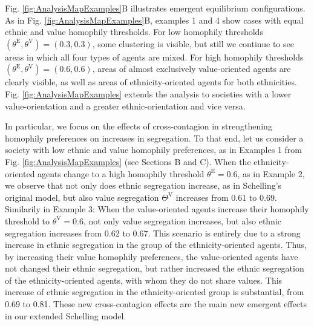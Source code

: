 \documentclass{ws-acs}
\begin{document}
{Fig. \ref{fig:AnalysisMapExamples}B illustrates emergent equilibrium configurations. As in Fig. \ref{fig:AnalysisMapExamples}B, examples 1 and 4 show cases with equal ethnic and value homophily thresholds. For low homophily thresholds $(\theta^\text{E}, \theta^\text{V}) = (0.3,0.3)$, some clustering is visible, but still we continue to see areas in which all four types of agents are mixed. For high homophily thresholds $(\theta^\text{E}, \theta^\text{V}) = (0.6,0.6)$, areas of almost exclusively value-oriented agents are clearly visible, as well as areas of ethnicity-oriented agents for both ethnicities. Fig. \ref{fig:AnalysisMapExamples} extends the analysis to societies with a lower value-orientation and a greater ethnic-orientation and vice versa. 

In particular, we focus on the effects of cross-contagion in strengthening homophily preferences on increases in segregation. To that end, let us consider a society with low ethnic and value homophily preferences, as in Examples 1 from Fig. \ref{fig:AnalysisMapExamples} (see Sections B and C). When the ethnicity-oriented agents change to a high homophily threshold $\theta^\text{E} = 0.6$, as in Example 2, we observe that not only does ethnic segregation increase, as in Schelling's original model, but also value segregation $\Theta^\text{V}$ increases from 0.61 to 0.69. 
Similarily in Example 3: When the value-oriented agents increase their homophily threshold to $\theta^\text{V} = 0.6$, not only value segregation increases, but also ethnic segregation increases from 0.62 to 0.67. This scenario is entirely due to a strong increase in ethnic segregation in the group of the ethnicity-oriented agents. Thus, by increasing their value homophily preferences, the value-oriented agents have not changed their ethnic segregation, but rather increased the ethnic segregation of the ethnicity-oriented agents, with whom they do not share values. This increase of ethnic segregation in the ethnicity-oriented group is substantial, from 0.69 to 0.81. These new cross-contagion effects are the main new emergent effects in our extended Schelling model.

}
\end{document}
